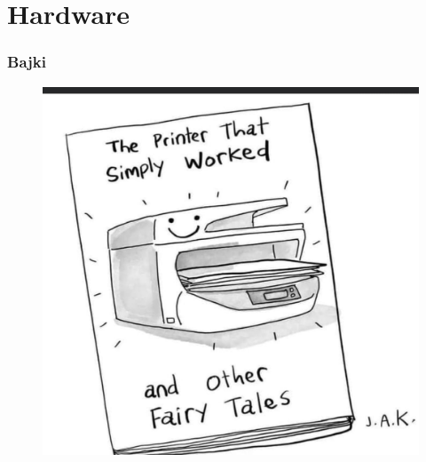 \documentclass[10pt,t]{beamer}
\begin{document}














\section{Hardware}



\begin{frame}
  \frametitle{Bajki}


  \begin{figure}

    \centering


    \includegraphics[scale=0.19]
    {./PresentationsPictures/Fairy-tales.jpg}

  \end{figure}

\end{frame}
\end{document}
